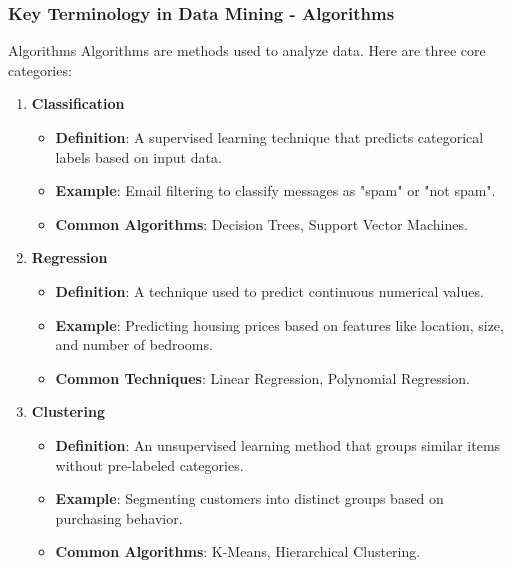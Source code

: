 \documentclass{beamer}
\begin{document}
\begin{frame}[fragile]
    \frametitle{Key Terminology in Data Mining - Algorithms}
    \begin{block}{Algorithms}
        Algorithms are methods used to analyze data. Here are three core categories:
        \begin{enumerate}
            \item \textbf{Classification}
                \begin{itemize}
                    \item \textbf{Definition}: A supervised learning technique that predicts categorical labels based on input data.
                    \item \textbf{Example}: Email filtering to classify messages as "spam" or "not spam".
                    \item \textbf{Common Algorithms}: Decision Trees, Support Vector Machines.
                \end{itemize}
            \item \textbf{Regression}
                \begin{itemize}
                    \item \textbf{Definition}: A technique used to predict continuous numerical values.
                    \item \textbf{Example}: Predicting housing prices based on features like location, size, and number of bedrooms.
                    \item \textbf{Common Techniques}: Linear Regression, Polynomial Regression.
                \end{itemize}
            \item \textbf{Clustering}
                \begin{itemize}
                    \item \textbf{Definition}: An unsupervised learning method that groups similar items without pre-labeled categories.
                    \item \textbf{Example}: Segmenting customers into distinct groups based on purchasing behavior.
                    \item \textbf{Common Algorithms}: K-Means, Hierarchical Clustering.
                \end{itemize} 
        \end{enumerate}
    \end{block}
\end{frame}
\end{document}
